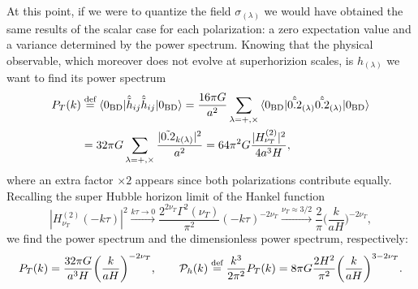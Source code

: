 At this point, if we were to quantize the field $\sigma_{(\lambda)}$ we would have obtained the same results of the scalar case for each polarization: a zero expectation value and a variance determined by the power spectrum. Knowing that the physical observable, which moreover does not evolve at superhorizion scales, is $h_{(\lambda)}$ we want to find its power spectrum
\begin{align*}
    {P}_T(k)&\stackrel{\text{def}}{=}\braket{0_\text{BD}|\hat{\tilde h}_{ij}\hat{\tilde h}_{ij}|0_\text{BD}}=\frac{16\pi G}{a^2}\sum_{\lambda=+,\times}\braket{0_\text{BD}|\hat{\tilde{0.2}}_{\mathbf(\lambda)}\hat{\tilde{0.2}}_{\mathbf(\lambda)}|0_\text{BD}} \\&=32\pi G\sum_{\lambda=+,\times}\frac{|\tilde{0.2}_{k(\lambda)}|^2}{a^2}=64\pi^2 G\frac{|H_{\nu_T}^{(2)}|^2}{4a^3H},
\end{align*}
where an extra factor $\times 2 $ appears since both polarizations contribute equally. Recalling the super Hubble horizon limit of the Hankel function
\begin{equation}
    |H_{\nu_T}^{(2)}(-k\tau)|^2\xrightarrow{k\tau\to 0}\frac{2^{2\nu_T}\Gamma^2(\nu_T)}{\pi^2}(-k\tau)^{-2\nu_T}\xrightarrow{\nu_T\approx3/2}\frac{2}{\pi}\bigg(\frac{k}{aH}\bigg)^{-2\nu_T},
\end{equation}
we find the power spectrum and the dimensionless power spectrum, respectively:
\begin{equation}
    {P}_T(k)=\frac{32\pi G}{a^3H}\bigg(\frac{k}{aH}\bigg)^{-2\nu_T},\qquad\mathcal{P}_h(k)\stackrel{\text{def}}{=}\frac{k^3}{2\pi^2}{P}_T(k)=8\pi G\frac{2H^2}{\pi^2}\bigg(\frac{k}{aH}\bigg)^{3-2\nu_T}.\label{eq:tensor_power_spectrum}
\end{equation}
